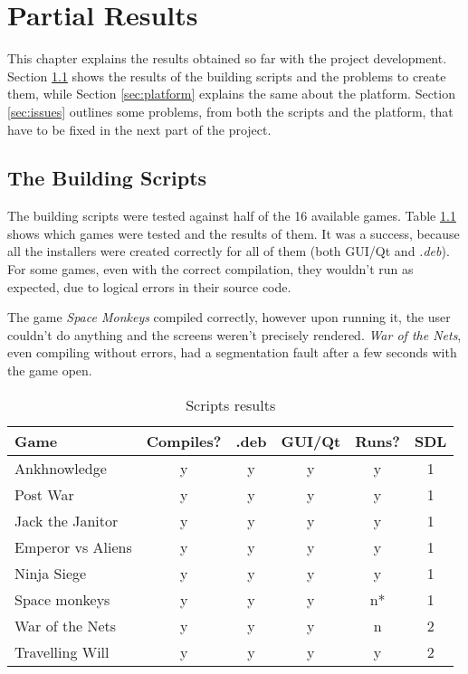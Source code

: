\chapter[Partial Results]{Partial Results}
\label{sec:results}

This chapter explains the results obtained so far with the project development. Section \ref{sec:building_scripts} shows the results of the building scripts and the problems to create them, while Section \ref{sec:platform} explains the same about the platform. Section \ref{sec:issues} outlines some problems, from both the scripts and the platform, that have to be fixed in the next part of the project.


\section{The Building Scripts}
\label{sec:building_scripts}

The building scripts were tested against half of the 16 available games. Table \ref{tab:script_games} shows which games were tested and the results of them. It was a success, because all the installers were created correctly for all of them (both GUI/Qt and \textit{.deb}). For some games, even with the correct compilation, they wouldn't run as expected, due to logical errors in their source code.

The game \textit{Space Monkeys} compiled correctly, however upon running it, the user couldn't do anything and the screens weren't precisely rendered. \textit{War of the Nets}, even compiling without errors, had a segmentation fault after a few seconds with the game open.

\begin{table}[h!]
\centering
\caption{Scripts results}
\label{tab:script_games}
\begin{tabular}{lccccc}
\toprule
\textbf{Game} & \multicolumn{1}{l}{\textbf{Compiles?}} & \multicolumn{1}{l}{\textbf{.deb}} & \multicolumn{1}{l}{\textbf{GUI/Qt}} & \multicolumn{1}{l}{\textbf{Runs?}} & \multicolumn{1}{l}{\textbf{SDL}} \\
\midrule
Ankhnowledge & y & y & y & y & 1 \\
Post War & y & y & y & y & 1 \\
Jack the Janitor & y & y & y & y & 1 \\
Emperor vs Aliens & y & y & y & y & 1 \\
Ninja Siege & y & y & y & y & 1 \\
Space monkeys & y & y & y & n* & 1 \\
War of the Nets & y & y & y & n & 2 \\
Travelling Will & y & y & y & y & 2 \\
\bottomrule
\end{tabular}
\end{table}

